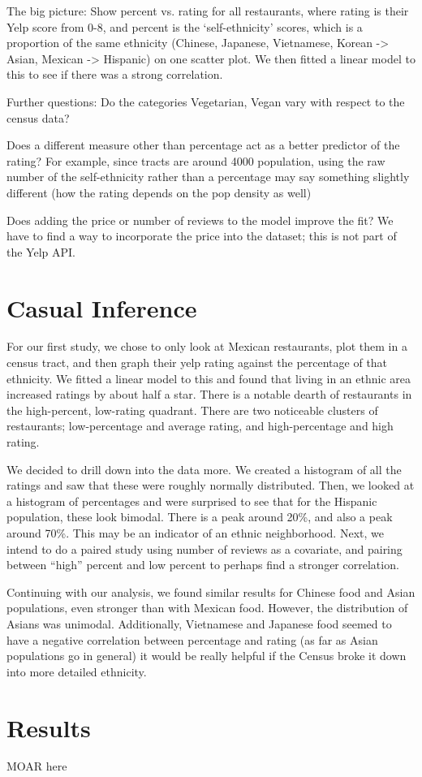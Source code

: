 \documentclass[11pt,twocolumn]{article}
\begin{document}
The big picture: Show percent vs. rating for all restaurants, where rating is their Yelp score from 0-8, and percent is the ‘self-ethnicity’ scores, which is a proportion of the same ethnicity (Chinese, Japanese, Vietnamese, Korean -> Asian, Mexican -> Hispanic) on one scatter plot. We then fitted a linear model to this to see if there was a strong correlation.

Further questions:
Do the categories Vegetarian, Vegan vary with respect to the census data?

Does a different measure other than percentage act as a better predictor of the rating? For example, since tracts are around 4000 population, using the raw number of the self-ethnicity rather than a percentage may say something slightly different (how the rating depends on the pop density as well)

Does adding the price or number of reviews to the model improve the fit? We have to find a way to incorporate the price into the dataset; this is not part of the Yelp API.

\section{Casual Inference}

For our first study, we chose to only look at Mexican restaurants, plot them in a census tract, and then graph their yelp rating against the percentage of that ethnicity. We fitted a linear model to this and found that living in an ethnic area increased ratings by about half a star. There is a notable dearth of restaurants in the high-percent, low-rating quadrant. There are two noticeable clusters of restaurants; low-percentage and average rating, and high-percentage and high rating.

We decided to drill down into the data more. We created a histogram of all the ratings and saw that these were roughly normally distributed. Then, we looked at a histogram of percentages and were surprised to see that for the Hispanic population, these look bimodal. There is a peak around 20\%, and also a peak around 70\%. This may be an indicator of an ethnic neighborhood. Next, we intend to do a paired study using number of reviews as a covariate, and pairing between “high” percent and low percent to perhaps find a stronger correlation.

Continuing with our analysis, we found similar results for Chinese food and Asian populations, even stronger than with Mexican food. However, the distribution of Asians was unimodal. Additionally, Vietnamese and Japanese food seemed to have a negative correlation between percentage and rating (as far as Asian populations go in general) it would be really helpful if the Census broke it down into more detailed ethnicity.

\section{Results}

MOAR here
\end{document}
